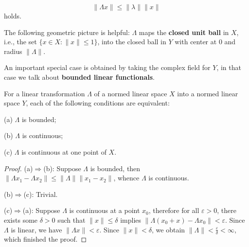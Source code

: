 $$\|\Lambda x\|\le\|\lambda\|\|x\|$$
holds.\par
The following geometric picture is helpful: $\Lambda$ maps the \textbf{closed unit ball} in $X$, i.e., the set $\{x\in X:\|x\|\le 1\}$, into the closed ball in $Y$ with center at $0$ and radius $\|\Lambda\|$.\par
An important special case is obtained by taking the complex field for $Y$, in that case we talk about \textbf{bounded linear functionals}.
\begin{theorem}
For a linear transformation $\Lambda$ of a normed linear space $X$ into a normed linear space $Y$, each of the following conditions are equivalent: \par
(a) $\Lambda$ is bounded;\par
(b) $\Lambda$ is continuous;\par
(c) $\Lambda$ is continuous at one point of $X$.
\end{theorem}
\begin{proof}
(a)$\Rightarrow$(b): Suppose $\Lambda$ is bounded, then $\|\Lambda x_1-\Lambda x_2\|\le\|\Lambda\|\|x_1-x_2\|$, whence $\Lambda$ is continuous.\par
(b)$\Rightarrow$(c): Trivial.\par
(c)$\Rightarrow$(a): Suppose $\Lambda$ is continuous at a point $x_0$, therefore for all $\varepsilon>0$, there exists some $\delta>0$ such that $\|x\|\le\delta$ implies $\|\Lambda(x_0+x)-\Lambda x_0\|<\varepsilon$. Since $\Lambda$ is linear, we have $\|\Lambda x\|<\varepsilon$. Since $\|x\|<\delta$, we obtain $\|\Lambda\|<\frac{\varepsilon}{\delta}<\infty$, which finished the proof.
\end{proof}

